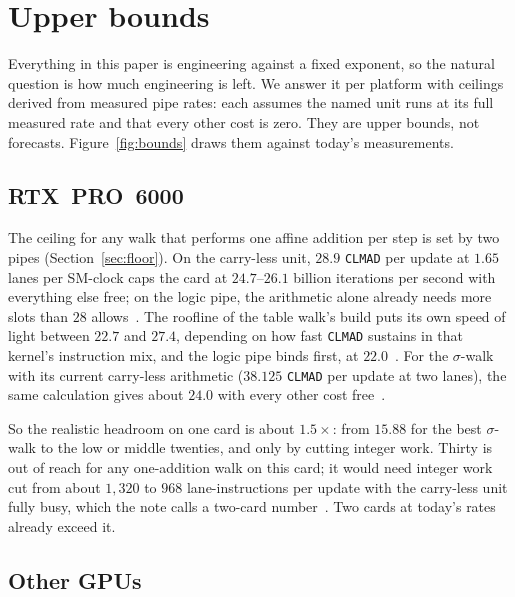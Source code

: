 \section{Upper bounds}
\label{sec:bounds}

Everything in this paper is engineering against a fixed exponent, so the
natural question is how much engineering is left. We answer it per
platform with ceilings derived from measured pipe rates: each assumes the
named unit runs at its full measured rate and that every other cost is
zero. They are upper bounds, not forecasts. Figure~\ref{fig:bounds}
draws them against today's measurements.



\subsection{RTX~PRO~6000}
\label{sec:bounds-6000}

The ceiling for any walk that performs one affine addition per step is
set by two pipes (Section~\ref{sec:floor}). On the carry-less unit,
$28.9$ \texttt{CLMAD} per update at $1.65$ lanes per SM-clock caps the card
at $24.7$--$26.1$ billion iterations per second with everything else
free; on the logic pipe, the arithmetic alone already needs more slots
than $28$ allows~. The roofline of the table
walk's build puts its own speed of light between $22.7$ and $27.4$,
depending on how fast \texttt{CLMAD} sustains in that kernel's
instruction mix, and the logic pipe binds first, at
$22.0$~. For the $\sigma$-walk with its
current carry-less arithmetic ($38.125$ \texttt{CLMAD} per update at two
lanes), the same calculation gives about $24.0$ with every other cost
free~.

So the realistic headroom on one card is about $1.5\times$: from $15.88$
for the best $\sigma$-walk to the low or middle twenties, and only by
cutting integer work. Thirty is out of reach for any one-addition walk
on this card; it would need integer work cut from about $1{,}320$ to $968$
lane-instructions per update with the carry-less unit fully busy, which
the note calls a two-card number~. Two cards at
today's rates already exceed it.

\subsection{Other GPUs}
\label{sec:bounds-other}

